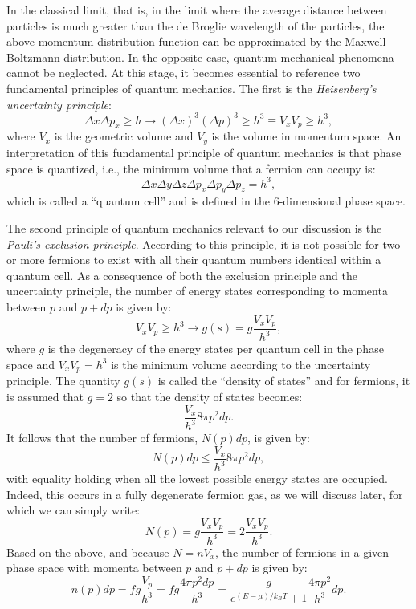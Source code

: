 \documentclass[main.tex]{subfiles}
\begin{document}
In the classical limit, that is, in the limit where the average distance between particles is much greater than the de Broglie wavelength of the particles, the above momentum distribution function can be approximated by the Maxwell-Boltzmann distribution. In the opposite case, quantum mechanical phenomena cannot be neglected. At this stage, it becomes essential to reference two fundamental principles of quantum mechanics. The first is the \textit{Heisenberg's uncertainty principle}:
\begin{equation}
\Delta x \Delta p_x \geq h \longrightarrow (\Delta x)^3 (\Delta p)^3 \geq h^3 \equiv V_x V_p \geq h^3,
\end{equation}
where $V_x$ is the geometric volume and $V_y$ is the volume in momentum space. An interpretation of this fundamental principle of quantum mechanics is that phase space is quantized, i.e., the minimum volume that a fermion can occupy is:
$$\Delta x \Delta y \Delta z \Delta p_x \Delta p_y \Delta p_z = h^3,$$
which is called a ``quantum cell'' and is defined in the 6-dimensional phase space.

The second principle of quantum mechanics relevant to our discussion is the \textit{Pauli's exclusion principle}. According to this principle, it is not possible for two or more fermions to exist with all their quantum numbers identical within a quantum cell. As a consequence of both the exclusion principle and the uncertainty principle, the number of energy states corresponding to momenta between $p$ and $p + dp$ is given by:
$$V_x V_p \geq h^3 \longrightarrow g(s) = g\frac{V_x V_p}{h^3},$$
where $g$ is the degeneracy of the energy states per quantum cell in the phase space and $V_x V_p = h^3$ is the minimum volume according to the uncertainty principle. The quantity $g(s)$ is called the ``density of states'' and for fermions, it is assumed that $g=2$ so that the density of states becomes:
$$ \frac{V_x}{h^3} 8 \pi p^2dp. $$
It follows that the number of fermions, $N(p)dp$, is given by:
$$N(p)dp \leq \frac{V_x}{h^3} 8 \pi p^2dp, $$
with equality holding when all the lowest possible energy states are occupied. Indeed, this occurs in a fully degenerate fermion gas, as we will discuss later, for which we can simply write:
$$N(p) = g \frac{V_x V_p}{h^3} = 2 \frac{V_x V_p}{h^3}.$$
Based on the above, and because $N = n V_x$, the number of fermions in a given phase space with momenta between $p$ and $p + dp$ is given by:
\begin{equation}
    n(p) dp = f g \frac{V_p}{h^3} = f g \frac{4\pi p^2 dp}{h^3} = \frac{g}{e^{(E - \mu)/k_B T} + 1} \frac{4\pi p^2}{h^3} dp.
\end{equation}
\end{document}
